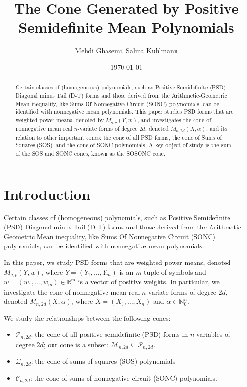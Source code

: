 \documentclass{article}
\title{The Cone Generated by Positive Semidefinite Mean Polynomials}
\author{Mehdi Ghasemi, Salma Kuhlmann}
\date{\today}
\begin{document}
\maketitle

\begin{abstract}
Certain classes of (homogeneous) polynomials, such as Positive Semidefinite (PSD) Diagonal minus Tail (D-T) 
forms and those derived from the Arithmetic-Geometric Mean inequality, like Sums Of Nonnegative Circuit (SONC) 
polynomials, can be identified with nonnegative mean polynomials. This paper studies PSD forms that are weighted 
power means, denoted by $M_{q,p}(Y, w)$, and investigates the cone of nonnegative mean real $n$-variate forms 
of degree $2d$, denoted $M_{n,2d}(X, \alpha)$, and its relation to other important cones: the cone of all PSD 
forms, the cone of Sums of Squares (SOS), and the cone of SONC polynomials. A key object of study is the sum 
of the SOS and SONC cones, known as the SOSONC cone.
\end{abstract}

\section{Introduction}\label{s00}

Certain classes of (homogeneous) polynomials, such as Positive Semidefinite (PSD) Diagonal minus Tail (D-T) forms and 
those derived from the Arithmetic-Geometric Mean inequality, like Sums Of Nonnegative Circuit (SONC) polynomials, can 
be identified with nonnegative mean polynomials.

In this paper, we study PSD forms that are weighted power means, denoted $M_{q,p}(Y, w)$, where $Y = (Y_1, \dots, Y_m)$ 
is an $m$-tuple of symbols and $w = (w_1, \dots, w_m) \in \mathbb{R}_+^m$ is a vector of positive weights. In particular, 
we investigate the cone of nonnegative mean real $n$-variate forms of degree $2d$, denoted $M_{n,2d}(X, \alpha)$, where 
$X = (X_1, \dots, X_n)$ and $\alpha \in \mathbb{N}_0^n$.

We study the relationships between the following cones:
\begin{itemize}
   \item $\mathcal{P}_{n,2d}$: the cone of all positive semidefinite (PSD) forms in $n$ variables of degree $2d$; our cone 
   is a subset: $\mathcal{M}_{n,2d} \subseteq \mathcal{P}_{n,2d}$.
   \item $\Sigma_{n,2d}$: the cone of sums of squares (SOS) polynomials.
   \item $\mathcal{C}_{n,2d}$: the cone of sums of nonnegative circuit (SONC) polynomials.
\end{itemize}
\end{document}
